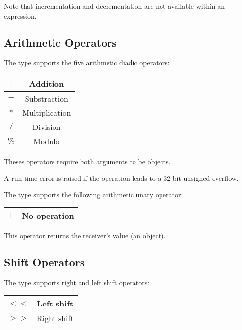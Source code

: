 Note that incrementation and decrementation are not available within an expression.




\subsection{Arithmetic Operators}

The  type supports the five arithmetic diadic operators:\newline

\begin{tabular}{|c|c|}
\hline
$+$ & Addition \\
\hline
$-$ & Substraction \\
\hline
$*$ & Multiplication \\
\hline
$/$ & Division \\
\hline
$\%$ & Modulo \\
\hline
\end{tabular}

Theses operators require both arguments to be  objects.\newline

A run-time error is raised if the operation leads to a 32-bit unsigned overflow.

The  type supports the following arithmetic unary operator:\newline

\begin{tabular}{|c|c|}
\hline
$+$ & No operation \\
\hline
\end{tabular}

This operator returns the receiver's value (an   object).






\subsection{Shift Operators}


The  type supports right and left shift operators:\newline

\begin{tabular}{|c|c|}
\hline
$<<$ & Left shift \\
\hline
$>>$ & Right shift \\
\hline
\end{tabular}

